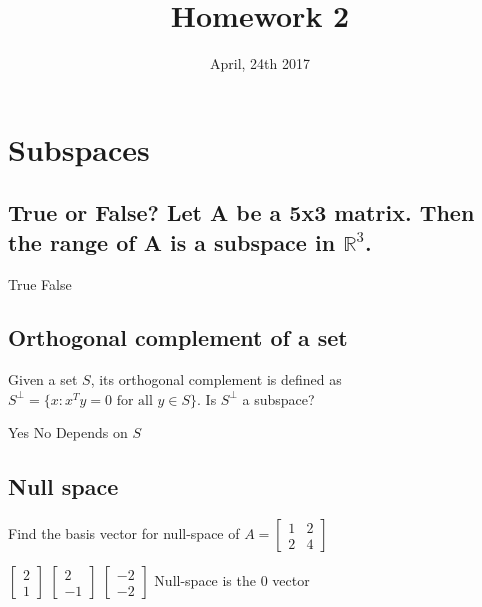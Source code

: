 \documentclass{exam}
\title{Homework 2}
\date{April, 24th 2017}
\begin{document}
\maketitle
\section{Subspaces}
\subsection{True or False? Let A be a 5x3 matrix. Then the range of A is a subspace in $\mathbb{R}^3$.}
\begin{oneparchoices}
 \choice True
 \choice False
\end{oneparchoices}

\subsection{Orthogonal complement of a set}
Given a set $S$, its orthogonal complement is defined as $S^{\perp} = \{x: x^Ty = 0 \mbox{ for all } y \in S\}$.
Is $S^{\perp}$ a subspace?
\begin{oneparchoices}
 \choice Yes
 \choice No 
 \choice Depends on $S$
\end{oneparchoices}


\subsection{Null space}
Find the basis vector for null-space of $A = \begin{bmatrix}
            1 & 2 \\
            2 & 4
          \end{bmatrix}$

\begin{oneparchoices}
\choice $\begin{bmatrix} 2 \\ 1 \end{bmatrix}$
\choice $\begin{bmatrix} 2 \\ -1 \end{bmatrix}$
\choice $\begin{bmatrix} -2 \\ -2 \end{bmatrix}$
\choice Null-space is the $0$ vector

\end{oneparchoices}
       
\end{document}
